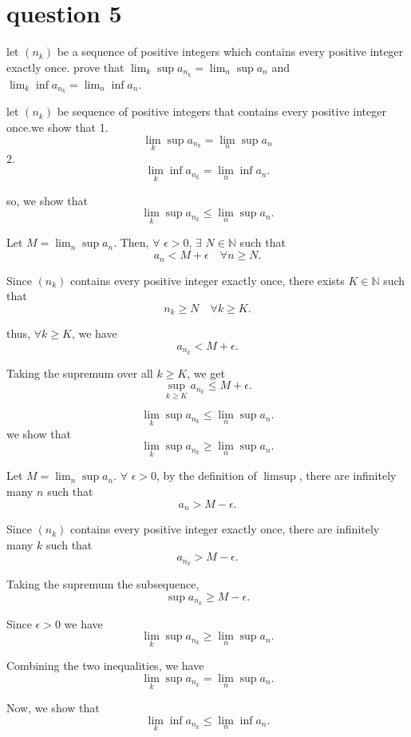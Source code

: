 \documentclass{article}
\begin{document}
\section{question 5} let $(n_k)$ be a sequence of positive integers which contains every
positive integer exactly once. prove that $\lim_{k} \sup a_{n_k} = \lim_{n} \sup a_n$ and $\lim_{k} \inf a_{n_k} = \lim_{n} \inf a_n$.

    let $(n_k)$ be sequence of positive integers that contains every positive integer once.we show that
    1. \[
    \lim_{k} \sup a_{n_k} = \lim_{n} \sup a_n
    \]
   2.  \[
    \lim_{k} \inf a_{n_k} = \lim_{n} \inf a_n.
    \]
    
    so, we show that
    \[
    \lim_{k} \sup a_{n_k} \leq \lim_{n} \sup a_n.
    \]
    
    Let \(M = \lim_{n} \sup a_n\). Then, $\forall$ \(\epsilon > 0\), $\exists$ \(N \in \mathbb{N}\) such that
    \[
    a_n < M + \epsilon \quad \forall n \geq N.
    \]
    
    Since \((n_k)\) contains every positive integer exactly once, there exists \(K \in \mathbb{N}\) such that
    \[
    n_k \geq N \quad \forall k \geq K.
    \]
    
    thus,  \(\forall k \geq K\), we have
    \[
    a_{n_k} < M + \epsilon.
    \]
    
    Taking the supremum over all \(k \geq K\), we get
    \[
    \sup_{k \geq K} a_{n_k} \leq M + \epsilon.
    \]
    
    \[
    \lim_{k} \sup a_{n_k} \leq \lim_{n} \sup a_n.
    \]
    we show that
    \[
    \lim_{k} \sup a_{n_k} \geq \lim_{n} \sup a_n.
    \]
    
    Let \(M = \lim_{n} \sup a_n\). $\forall$ \(\epsilon > 0\), by the definition of \(\limsup\), there are infinitely many \(n\) such that
    \[
    a_n > M - \epsilon.
    \]
    
    Since \((n_k)\) contains every positive integer exactly once, there are infinitely many \(k\) such that
    \[
    a_{n_k} > M - \epsilon.
    \]
    
    Taking the supremum the subsequence, 
    \[
    \sup a_{n_k} \geq M - \epsilon.
    \]
    
    Since \(\epsilon > 0\) we have
    \[
    \lim_{k} \sup a_{n_k} \geq \lim_{n} \sup a_n.
    \]
    
    Combining the two inequalities, we have
    \[
    \lim_{k} \sup a_{n_k} = \lim_{n} \sup a_n.
    \]
    
    Now, we show that
    \[
    \lim_{k} \inf a_{n_k} \leq \lim_{n} \inf a_n.
    \]
    
\end{document}
